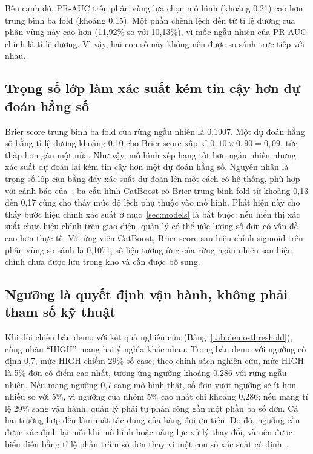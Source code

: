Bên cạnh đó, PR-AUC trên phân vùng lựa chọn mô hình (khoảng 0,21) cao hơn trung bình ba fold (khoảng 0,15). Một phần chênh lệch đến từ tỉ lệ dương của phân vùng này cao hơn (11,92\% so với 10,13\%), vì mốc ngẫu nhiên của PR-AUC chính là tỉ lệ dương. Vì vậy, hai con số này không nên được so sánh trực tiếp với nhau.

\subsection{Trọng số lớp làm xác suất kém tin cậy hơn dự đoán hằng số}

Brier score trung bình ba fold của rừng ngẫu nhiên là 0,1907. Một dự đoán hằng số bằng tỉ lệ dương khoảng 0,10 cho Brier score xấp xỉ $0{,}10 \times 0{,}90 = 0{,}09$, tức thấp hơn gần một nửa. Như vậy, mô hình xếp hạng tốt hơn ngẫu nhiên nhưng xác suất dự đoán lại kém tin cậy hơn một dự đoán hằng số. Nguyên nhân là trọng số lớp cân bằng đẩy xác suất dự đoán lên một cách có hệ thống, phù hợp với cảnh báo của~\textcite{vandengoorbergh2022}; ba cấu hình CatBoost có Brier trung bình fold từ khoảng 0,13 đến 0,17 cũng cho thấy mức độ lệch phụ thuộc vào mô hình. Phát hiện này cho thấy bước hiệu chỉnh xác suất ở mục~\ref{sec:models} là bắt buộc: nếu hiển thị xác suất chưa hiệu chỉnh trên giao diện, quản lý có thể ước lượng số đơn có vấn đề cao hơn thực tế. Với ứng viên CatBoost, Brier score sau hiệu chỉnh sigmoid trên phân vùng so sánh là 0,1071; số liệu tương ứng của rừng ngẫu nhiên sau hiệu chỉnh chưa được lưu trong kho và cần được bổ sung.

\subsection{Ngưỡng là quyết định vận hành, không phải tham số kỹ thuật}

Khi đối chiếu bản demo với kết quả nghiên cứu (Bảng~\ref{tab:demo-threshold}), cùng nhãn ``HIGH'' mang hai ý nghĩa khác nhau. Trong bản demo với ngưỡng cố định 0,7, mức HIGH chiếm 29\% số case; theo chính sách nghiên cứu, mức HIGH là 5\% đơn có điểm cao nhất, tương ứng ngưỡng khoảng 0,286 với rừng ngẫu nhiên. Nếu mang ngưỡng 0,7 sang mô hình thật, số đơn vượt ngưỡng sẽ ít hơn nhiều so với 5\%, vì ngưỡng của nhóm 5\% cao nhất chỉ khoảng 0,286; nếu mang tỉ lệ 29\% sang vận hành, quản lý phải tự phân công gần một phần ba số đơn. Cả hai trường hợp đều làm mất tác dụng của hàng đợi ưu tiên. Do đó, ngưỡng cần được xác định lại mỗi khi mô hình hoặc năng lực xử lý thay đổi, và nên được biểu diễn bằng tỉ lệ phần trăm số đơn thay vì một con số xác suất cố định~\cite{gomezvargas2025}.
